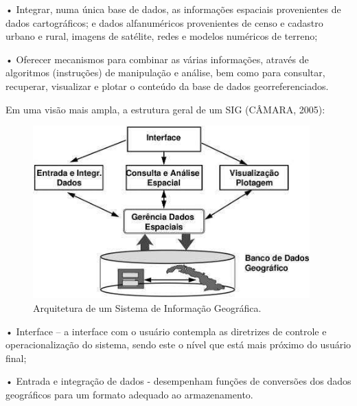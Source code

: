 \documentclass[
	12pt,				%
    oneside,			%
	a4paper,			%
	english,			%
	french,				%
	spanish,			%
	brazil,				%
	]{abntex2}
\begin{document}
•	Integrar, numa única base de dados, as informações espaciais provenientes de dados cartográficos; e dados alfanuméricos provenientes de censo e cadastro urbano e rural, imagens de satélite, redes e modelos numéricos de terreno;

•	Oferecer mecanismos para combinar as várias informações, através de algoritmos (instruções) de manipulação e análise, bem como para consultar, recuperar, visualizar e plotar o conteúdo da base de dados georreferenciados.



Em uma visão mais ampla, a estrutura geral de um SIG (CÂMARA, 2005): 

\begin{figure} [hbt] 
\label{figura1} 
\caption{Arquitetura de um Sistema de Informação Geográfica.}
\includegraphics[width=0.95\textwidth]{arquitetura.png} %
\end{figure}

•	Interface – a interface com o usuário contempla as diretrizes de controle e operacionalização do sistema, sendo este o nível que está mais próximo do usuário final; 

•	Entrada e integração de dados - desempenham funções de conversões dos dados geográficos para um formato adequado ao armazenamento.
\end{document}
